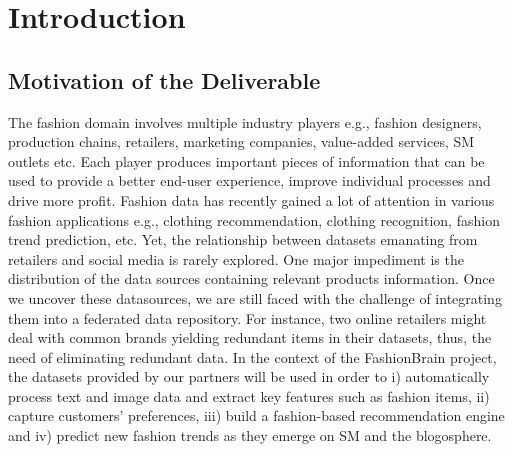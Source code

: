 \chapter{Introduction}
\label{chap:intro}


\section{Motivation of the Deliverable}
\label{sec:motiv}

The fashion domain involves multiple industry players e.g., fashion designers, production chains, retailers, marketing companies, value-added services, \ac{SM} outlets etc. Each player produces important pieces of information that can be used to provide a better end-user experience, improve individual processes and drive more profit. Fashion data has recently gained a lot of attention in various fashion applications e.g., clothing recommendation, clothing recognition, fashion trend prediction, etc. Yet, the relationship between datasets emanating from retailers and social media is rarely explored. One major impediment is the distribution of the data sources containing relevant products information. Once we uncover these datasources, we are still faced with the challenge of integrating them into a federated data repository. For instance, two online retailers might deal with common brands yielding redundant items in their datasets, thus, the need of eliminating redundant data. In the context of the FashionBrain project, the datasets provided by our partners will be used in order to i) automatically process text and image data and extract key features such as fashion items, ii) capture customers’ preferences, iii) build a fashion-based recommendation engine and iv) predict new fashion trends as they emerge on \ac{SM} and the blogosphere. 


